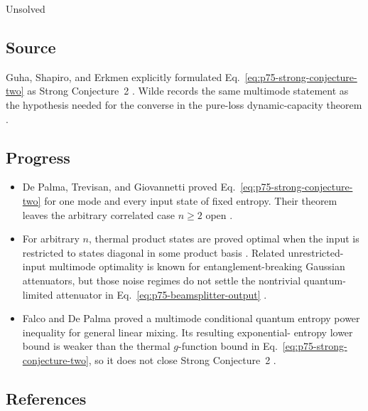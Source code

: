 Unsolved

\subsection*{Source}

Guha, Shapiro, and Erkmen explicitly formulated
Eq.~\eqref{eq:p75-strong-conjecture-two} as Strong Conjecture~2
.  Wilde records the same
multimode statement as the hypothesis needed for the converse in the
pure-loss dynamic-capacity theorem
.

\subsection*{Progress}

\begin{itemize}
  \item De Palma, Trevisan, and Giovannetti proved
  Eq.~\eqref{eq:p75-strong-conjecture-two} for one mode and every input state
  of fixed entropy.  Their theorem leaves the arbitrary correlated case
  $n\geq2$ open
  .

  \item For arbitrary $n$, thermal product states are proved optimal when the
  input is restricted to states diagonal in some product basis
  .  Related unrestricted-input
  multimode optimality is known for entanglement-breaking Gaussian
  attenuators, but those noise regimes do not settle the nontrivial
  quantum-limited attenuator in
  Eq.~\eqref{eq:p75-beamsplitter-output}
  .

  \item Falco and De Palma proved a multimode conditional quantum entropy
  power inequality for general linear mixing.  Its resulting exponential-
  entropy lower bound is weaker than the thermal $g$-function bound in
  Eq.~\eqref{eq:p75-strong-conjecture-two}, so it does not close Strong
  Conjecture~2
  .
\end{itemize}

\subsection*{References}

